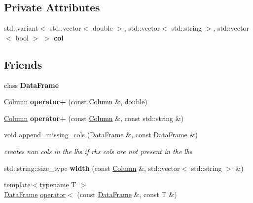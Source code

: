 \subsection*{Private Attributes}
\begin{DoxyCompactItemize}
\item 
\mbox{\label{classColumn_afc2ec33bb14a25834cc0d4a272fe0a9d}} 
std\+::variant$<$ std\+::vector$<$ double $>$, std\+::vector$<$ std\+::string $>$, std\+::vector$<$ bool $>$ $>$ {\bfseries col}
\end{DoxyCompactItemize}
\subsection*{Friends}
\begin{DoxyCompactItemize}
\item 
\mbox{\label{classColumn_ac3cf826bc43b8ab4740915b5c60e7166}} 
class {\bfseries Data\+Frame}
\item 
\mbox{\label{classColumn_a0073d63e1317b7b2bad1c4daa275b0ba}} 
\hyperlink{classColumn}{Column} {\bfseries operator+} (const \hyperlink{classColumn}{Column} \&, double)
\item 
\mbox{\label{classColumn_a07ec03095bd9fec0ccdccafcadef8ea2}} 
\hyperlink{classColumn}{Column} {\bfseries operator+} (const \hyperlink{classColumn}{Column} \&, const std\+::string \&)
\item 
void \hyperlink{classColumn_a27cc8acd51a5cd40e6a2726368914661}{append\+\_\+missing\+\_\+cols} (\hyperlink{classDataFrame}{Data\+Frame} \&, const \hyperlink{classDataFrame}{Data\+Frame} \&)
\begin{DoxyCompactList}\small\item\em creates nan cols in the lhs if rhs cols are not present in the lhs \end{DoxyCompactList}\item 
\mbox{\label{classColumn_acbe8416c515df226506ae71d8c6fd05a}} 
std\+::string\+::size\+\_\+type {\bfseries width} (const \hyperlink{classColumn}{Column} \&, std\+::vector$<$ std\+::string $>$ \&)
\item 
{\footnotesize template$<$typename T $>$ }\\\hyperlink{classDataFrame}{Data\+Frame} \hyperlink{classColumn_a92ccb0425c54a5b5cd6f78ed1bb4c3ff}{operator$<$} (const \hyperlink{classDataFrame}{Data\+Frame} \&, const T \&)

\end{DoxyCompactItemize}
